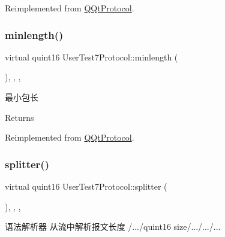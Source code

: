 Reimplemented from \mbox{\hyperlink{class_q_qt_protocol_af41bc3116abbbcfc9af45e151a253ff7}{Q\+Qt\+Protocol}}.

\mbox{\label{class_user_test7_protocol_a891a44bf8ae811b4c02cc6707dea72bf}} 
\subsubsection{\texorpdfstring{minlength()}{minlength()}}
{\footnotesize\ttfamily virtual quint16 User\+Test7\+Protocol\+::minlength (\begin{DoxyParamCaption}{ }\end{DoxyParamCaption})\hspace{0.3cm}{\ttfamily [inline]}, {\ttfamily [override]}, {\ttfamily [protected]}, {\ttfamily [virtual]}}



最小包长 

\begin{DoxyReturn}{Returns}

\end{DoxyReturn}


Reimplemented from \mbox{\hyperlink{class_q_qt_protocol_a2b00f53d3dd0eed817eeecff422891f3}{Q\+Qt\+Protocol}}.

\mbox{\label{class_user_test7_protocol_aa213a9855a1aac4dd4946fe16a4ef52f}} 
\subsubsection{\texorpdfstring{splitter()}{splitter()}}
{\footnotesize\ttfamily virtual quint16 User\+Test7\+Protocol\+::splitter (\begin{DoxyParamCaption}\item[{const Q\+Byte\+Array \&}]{ }\end{DoxyParamCaption})\hspace{0.3cm}{\ttfamily [inline]}, {\ttfamily [override]}, {\ttfamily [protected]}, {\ttfamily [virtual]}}



语法解析器 从流中解析报文长度 /.../quint16 size/.../.../... 


